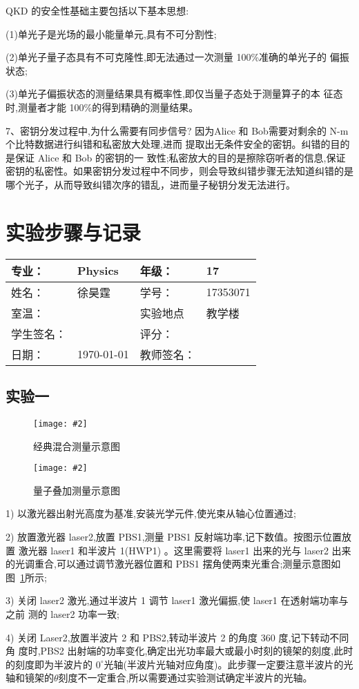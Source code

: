 \documentclass[11pt,a4paper]{ctexart}
\newcommand{\cpic}[2]{
\begin{center}
\texttt{[image: \#2]}
\end{center}
}
\newcommand{\cpicn}[3]
{
\begin{figure}[H]
\cpic{#1}{#2}
\caption{\color{red}#3\label{#2}}
\end{figure}
}
\begin{document}
QKD 的安全性基础主要包括以下基本思想:

(1)单光子是光场的最小能量单元,具有不可分割性;

(2)单光子量子态具有不可克隆性,即无法通过一次测量 100\%准确的单光子的
偏振状态;

(3)单光子偏振状态的测量结果具有概率性,即仅当量子态处于测量算子的本
征态时,测量者才能 100\%的得到精确的测量结果。


7、密钥分发过程中,为什么需要有同步信号?
因为Alice 和 Bob需要对剩余的 N-m 个比特数据进行纠错和私密放大处理,进而
提取出无条件安全的密钥。纠错的目的是保证 Alice 和 Bob 的密钥的一
致性;私密放大的目的是擦除窃听者的信息,保证密钥的私密性。如果密钥分发过程中不同步，则会导致纠错步骤无法知道纠错的是哪个光子，从而导致纠错次序的错乱，进而量子秘钥分发无法进行。


\newpage
\section{实验步骤与记录}
\begin{tabular}{|p{8em}|p{8em}|p{8em}|p{8em}|}
	\hline 
	专业：     &Physics       &年级：      & 17     \\
	\hline
	姓名：& 徐昊霆 &学号：&17353071  \\
	\hline
	室温：&                    &实验地点 & 教学楼 \\
	\hline	
	学生签名： & & 评分： & \\
	\hline
	日期： & \today & 教师签名：&  \\
	\hline
\end{tabular}
\subsection{实验一}
\cpicn{0.3}{1-2}{经典混合测量示意图}
\cpicn{0.3}{1-3}{量子叠加测量示意图}
1) 以激光器出射光高度为基准,安装光学元件,使光束从轴心位置通过;

2) 放置激光器 laser2,放置 PBS1,测量 PBS1 反射端功率,记下数值。按图示位置放置
激光器 laser1 和半波片 1(HWP1)
。这里需要将 laser1 出来的光与 laser2 出来的光调重合,可以通过调节激光器位置和 PBS1 摆角使两束光重合;测量示意图如图~\ref{1-2}所示;

3) 关闭 laser2 激光,通过半波片 1 调节 laser1 激光偏振,使 laser1 在透射端功率与之前
测的 laser2 功率一致;

4) 关闭 Laser2,放置半波片 2 和 PBS2,转动半波片 2 的角度 360 度,记下转动不同角
度时,PBS2 出射端的功率变化,确定出光功率最大或最小时刻的镜架的刻度,此时
的刻度即为半波片的 $0^{\circ}$光轴(半波片光轴对应角度)。此步骤一定要注意半波片的光
轴和镜架的$\theta$刻度不一定重合,所以需要通过实验测试确定半波片的光轴。
\end{document}
